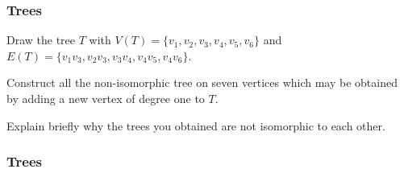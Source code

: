 \documentclass{beamer}
\begin{document}
\begin{frame}
\frametitle{Trees }
Draw the tree $T$ with $V(T) = \{v_1,v_2,v_3,v_4,v_5,v_6\}$ and $E(T)= \{v_1v_3, v_2v_3, v_3v_4,v_4v_5,v_4v_6\}$.

Construct all the non-isomorphic tree on seven vertices which may be obtained by adding a new vertex of degree one to $T$.

Explain briefly why the trees you obtained are not isomorphic to each other.



\end{frame}
\begin{frame}
\frametitle{Trees}


\end{frame}
\end{document}
